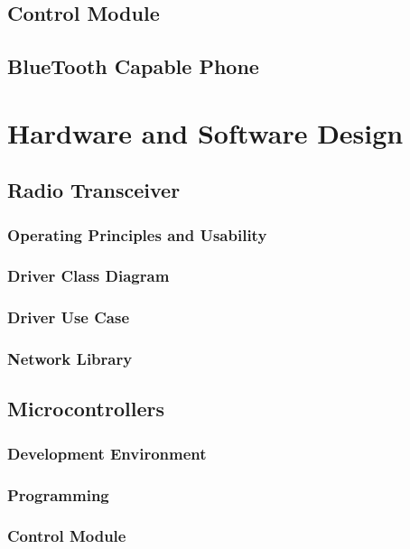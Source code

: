  \subsection{Control Module}
\lipsum[1]
 \subsection{BlueTooth Capable Phone}
\lipsum[1]
\section{Hardware and Software Design}
\lipsum[1]
 \subsection{Radio Transceiver}
\lipsum[1]
  \subsubsection{Operating Principles and Usability}
\lipsum[1]
  \subsubsection{Driver Class Diagram}
\lipsum[1]
  \subsubsection{Driver Use Case}
\lipsum[1]
  \subsubsection{Network Library}
\lipsum[1]
 \subsection{Microcontrollers}
\lipsum[1]
  \subsubsection{Development Environment}
\lipsum[1]
  \subsubsection{Programming}
\lipsum[1]
  \subsubsection{Control Module}
\lipsum[1]
